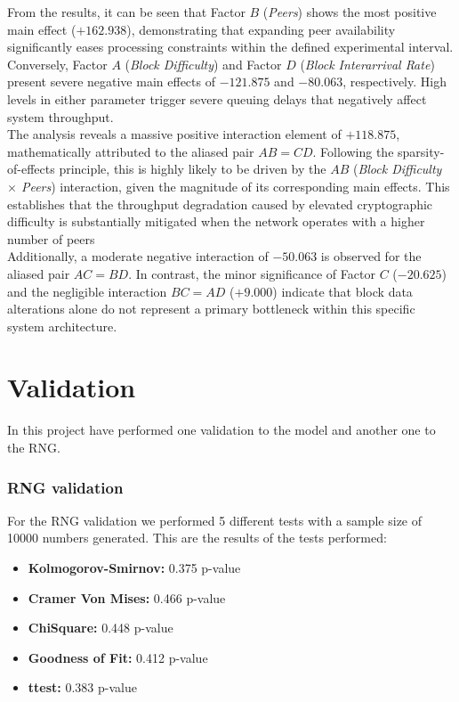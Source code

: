 \documentclass[12pt,a4paper]{article}
\begin{document}
	From the results, it can be seen that Factor $B$ (\textit{Peers}) shows the most positive main effect ($+162.938$), demonstrating that expanding peer availability significantly eases processing constraints within the defined experimental interval. Conversely, Factor $A$ (\textit{Block Difficulty}) and Factor $D$ (\textit{Block Interarrival Rate}) present severe negative main effects of $-121.875$ and $-80.063$, respectively. High levels in either parameter trigger severe queuing delays that negatively affect system throughput. \\
	
	\noindent The analysis reveals a massive positive interaction element of $+118.875$, mathematically attributed to the aliased pair $AB = CD$. Following the sparsity-of-effects principle, this is highly likely to be driven by the $AB$ (\textit{Block Difficulty $\times$ Peers}) interaction, given the magnitude of its corresponding main effects. This establishes that the throughput degradation caused by elevated cryptographic difficulty is substantially mitigated when the network operates with a higher number of peers \\
	
	\noindent Additionally, a moderate negative interaction of $-50.063$ is observed for the aliased pair $AC = BD$. In contrast, the minor significance of Factor $C$ ($-20.625$) and the negligible interaction $BC = AD$ ($+9.000$) indicate that block data alterations alone do not represent a primary bottleneck within this specific system architecture.
	
	\section{Validation}
	\label{sec:validation}
	In this project have performed one validation to the model and another one to the RNG.
	
	\subsubsection*{RNG validation}
	
	For the RNG validation we performed 5 different tests with a sample size of 10000 numbers generated. This are the results of the tests performed:
	
	\begin{itemize}
		\item \textbf{Kolmogorov-Smirnov:} 0.375 p-value
		\item \textbf{Cramer Von Mises:} 0.466 p-value
		\item \textbf{ChiSquare:} 0.448 p-value
		\item \textbf{Goodness of Fit:} 0.412 p-value
		\item \textbf{ttest:} 0.383 p-value
	\end{itemize}
	
\end{document}
